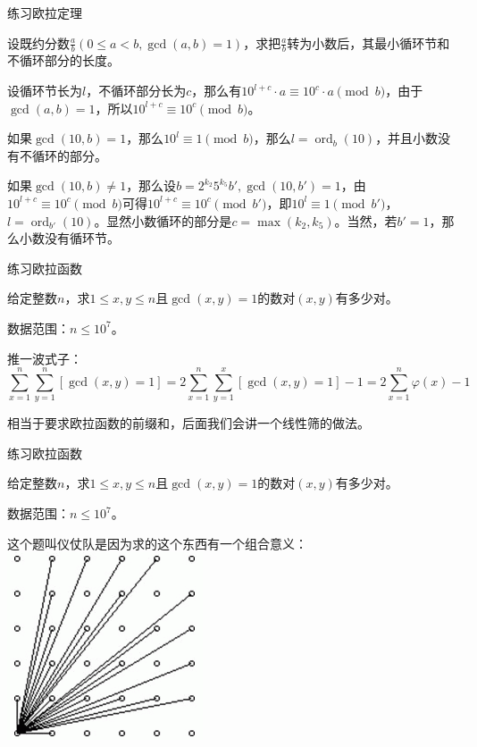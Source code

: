 \documentclass{ctexbeamer}        %
\newcommand{\ord}{\operatorname{ord}}
\begin{document}
\begin{frame}{练习}{欧拉定理}

\begin{example}[循环小数]
	设既约分数$\frac{a}{b}(0\le a<b,\gcd(a,b)=1)$，求把$\frac{a}{b}$转为小数后，其最小循环节和不循环部分的长度。
\end{example}
\pause
设循环节长为$l$，不循环部分长为$c$，那么有$10^{l+c} \cdot a \equiv 10^c \cdot a \pmod b$，由于$\gcd(a,b)=1$，所以$10^{l+c} \equiv 10^c \pmod b$。

如果$\gcd(10,b) = 1$，那么$10^l \equiv 1 \pmod b$，那么$l=\ord_b(10)$，并且小数没有不循环的部分。

如果$\gcd(10,b) \neq 1$，那么设$b=2^{k_2}5^{k_5}b',\gcd(10,b')=1$，由$10^{l+c} \equiv 10^c \pmod b$可得$10^{l+c} \equiv 10^c \pmod{b'}$，即$10^l \equiv 1 \pmod{b'}$，$l=\ord_{b'}(10)$。显然小数循环的部分是$c=\max(k_2,k_5)$。当然，若$b'=1$，那么小数没有循环节。
\end{frame}

\begin{frame}{练习}{欧拉函数}

\begin{example}[仪仗队]
	给定整数$n$，求$1\le x,y \le n$且$\gcd(x,y)=1$的数对$(x,y)$有多少对。

	数据范围：$n\le 10^7$。
\end{example}
\pause
推一波式子：
$$\sum_{x=1}^n \sum_{y=1}^n [\gcd(x,y)=1]=2\sum_{x=1}^n \sum_{y=1}^{x} [\gcd(x,y)=1] - 1=2\sum_{x=1}^n \varphi(x) - 1$$

相当于要求欧拉函数的前缀和，后面我们会讲一个线性筛的做法。
\end{frame}

\begin{frame}{练习}{欧拉函数}

\begin{example}[仪仗队]
	给定整数$n$，求$1\le x,y \le n$且$\gcd(x,y)=1$的数对$(x,y)$有多少对。

	数据范围：$n\le 10^7$。
\end{example}
这个题叫仪仗队是因为求的这个东西有一个组合意义：
\includegraphics[scale=0.6]{figure1.png}
\end{frame}
\end{document}
